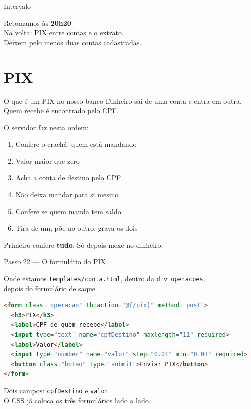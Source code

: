 \documentclass[aspectratio=169,11pt]{beamer}
\newcommand{\onde}[1]{%
  \begin{block}{Onde estamos}
    #1
  \end{block}
}
\begin{document}
\begin{frame}{Intervalo}
  \begin{center}
    \Large Retomamos às \textbf{20h20}\\[0.8em]
    \normalsize
    Na volta: PIX entre contas e o extrato.\\
    Deixem pelo menos duas contas cadastradas.
  \end{center}
\end{frame}

\section{PIX}

\begin{frame}{O que é um PIX no nosso banco}
  Dinheiro sai de uma conta e entra em outra.\\
  Quem recebe é encontrado pelo CPF.

  \vspace{0.5em}
  O servidor faz nesta ordem:
  \begin{enumerate}
    \item Confere o crachá: quem está mandando
    \item Valor maior que zero
    \item Acha a conta de destino pelo CPF
    \item Não deixa mandar para si mesmo
    \item Confere se quem manda tem saldo
    \item Tira de um, põe no outro, grava os dois
  \end{enumerate}

  \vspace{0.3em}
  Primeiro confere \textbf{tudo}. Só depois mexe no dinheiro.
\end{frame}

\begin{frame}[fragile]{Passo 22 --- O formulário do PIX}
  \onde{\texttt{templates/conta.html}, dentro da \texttt{div operacoes},\\
        depois do formulário de saque}

\begin{lstlisting}[language=HTML,basicstyle=\ttfamily\scriptsize]
<form class="operacao" th:action="@{/pix}" method="post">
  <h3>PIX</h3>
  <label>CPF de quem recebe</label>
  <input type="text" name="cpfDestino" maxlength="11" required>
  <label>Valor</label>
  <input type="number" name="valor" step="0.01" min="0.01" required>
  <button class="botao" type="submit">Enviar PIX</button>
</form>
\end{lstlisting}

  Dois campos: \texttt{cpfDestino} e \texttt{valor}.\\
  O CSS já coloca os três formulários lado a lado.
\end{frame}
\end{document}
